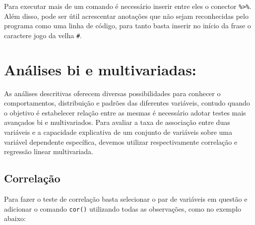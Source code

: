 \documentclass[
  brazil,
]{book}
\newenvironment{Shaded}{\begin{snugshade}}{\end{snugshade}}
\newcommand{\CommentTok}[1]{\textcolor[rgb]{0.56,0.35,0.01}{\textit{#1}}}
\newcommand{\DataTypeTok}[1]{\textcolor[rgb]{0.13,0.29,0.53}{#1}}
\newcommand{\KeywordTok}[1]{\textcolor[rgb]{0.13,0.29,0.53}{\textbf{#1}}}
\newcommand{\NormalTok}[1]{#1}
\newcommand{\OperatorTok}[1]{\textcolor[rgb]{0.81,0.36,0.00}{\textbf{#1}}}
\newcommand{\OtherTok}[1]{\textcolor[rgb]{0.56,0.35,0.01}{#1}}
\newcommand{\StringTok}[1]{\textcolor[rgb]{0.31,0.60,0.02}{#1}}
\begin{document}
Para executar mais de um comando é necessário inserir entre eles o conector \texttt{\%\textgreater{}\%}. Além disso, pode ser útil acrescentar anotações que não sejam reconhecidas pelo programa como uma linha de código, para tanto basta inserir no início da frase o caractere jogo da velha \texttt{\#}.

\begin{Shaded}
\end{Shaded}

\hypertarget{anuxe1lises-bi-e-multivariadas}{%
\section{Análises bi e multivariadas:}\label{anuxe1lises-bi-e-multivariadas}}

As análises descritivas oferecem diversas possibilidades para conhecer o comportamentos, distribuição e padrões das diferentes variáveis, contudo quando o objetivo é estabelecer relação entre as mesmas é necessário adotar testes mais avançados bi e multivariados. Para avaliar a taxa de associação entre duas variáveis e a capacidade explicativa de um conjunto de variáveis sobre uma variável dependente específica, devemos utilizar respectivamente correlação e regressão linear multivariada.

\hypertarget{correlauxe7uxe3o}{%
\subsection{Correlação}\label{correlauxe7uxe3o}}

Para fazer o teste de correlação basta selecionar o par de variáveis em questão e adicionar o comando \texttt{cor()} utilizando todas as observações, como no exemplo abaixo:

\begin{Shaded}
\end{Shaded}
\end{document}
